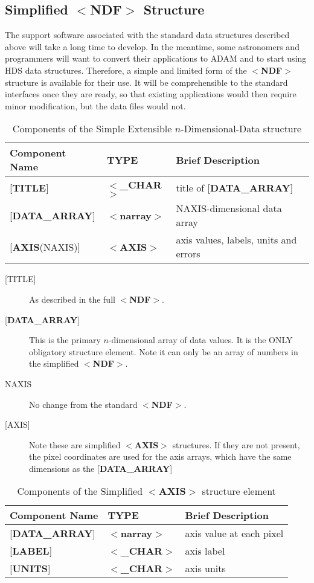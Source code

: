 \documentclass[twoside,11pt,nolof,noabs]{starlink}
\begin{document}
\subsection{Simplified $<$\textbf{NDF}$>$ Structure\label{se:sndf}}

The support software associated with the
standard data structures described above
will take a long time to develop. In the meantime, some astronomers
and programmers will want to convert their applications to {\small ADAM} and
to start using HDS data structures.  Therefore, a simple and limited
form of the $<$\textbf{NDF}$>$ structure is available for their use.  It will be
comprehensible to the standard interfaces once they are ready, so
that existing
applications would then require minor modification, but the data files would
not.

\begin{table}
\centering
\caption{Components of the Simple Extensible $n$-Dimensional-Data structure}
\begin{tabular}{|l|l|l|}
\hline
Component Name & TYPE & Brief Description \\ \hline
{[}\textbf{TITLE}{]} & $<$\textbf{\_CHAR}$>$ & title of {[}\textbf{DATA\_ARRAY}{]} \\
{[}\textbf{DATA\_ARRAY}{]} & $<$\textbf{narray}$>$ & NAXIS-dimensional data array \\
{[}\textbf{AXIS}(NAXIS){]} & $<$\textbf{AXIS}$>$ & axis values, labels, units and errors \\ \hline
\end{tabular}
\end{table}

\begin{description}
\item [{[}TITLE{]}]  As described in the full $<$\textbf{NDF}$>$.
\item [{[}\textbf{DATA\_ARRAY}{]}]  This is the primary
$n$-dimensional array of data values.
It is the ONLY obligatory structure element.  Note it can only be an array
of numbers in the simplified $<$\textbf{NDF}$>$.
\item [NAXIS]  No change from the standard $<$\textbf{NDF}$>$.
\item [{[}AXIS{]}] Note these are simplified $<$\textbf{AXIS}$>$ structures.
If they are not present, the pixel coordinates are used for the
axis arrays, which have the
same dimensions as the {[}\textbf{DATA\_ARRAY}{]}
\end{description}

\begin{table}
\centering
\caption{Components of the Simplified $<$\textbf{AXIS}$>$ structure element}
\begin{tabular}{|l|l|l|}
\hline
Component Name & TYPE & Brief Description \\ \hline
{[}\textbf{DATA\_ARRAY}{]} & $<$\textbf{narray}$>$ & axis value at each pixel \\
{[}\textbf{LABEL}{]} & $<$\textbf{\_CHAR}$>$ & axis label \\
{[}\textbf{UNITS}{]} & $<$\textbf{\_CHAR}$>$ & axis units \\ \hline
\end{tabular}
\end{table}
\end{document}
